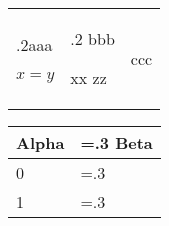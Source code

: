 \documentclass{article}
\begin{document}
	
	\begin{tabularx}{\textwidth}{
			>{\hsize.2\hsize}X|
			>{\hsize.2\hsize}X|
			X|}
		aaa
		
		\[x=y\]
		&
		bbb
		
		xx
		zz
		
		&ccc

	\end{tabularx}

\begin{table}[htbp]
    \centering
    \begin{tabularx}{\textwidth}{
    		X
    		>{\hsize=.3\hsize}X
    		}
        \hline
        Alpha     & Beta         \\ \hline
        0         & 2               \\ \hline
        1         & 3                \\ \hline
    \end{tabularx}
\end{table}
\end{document}
